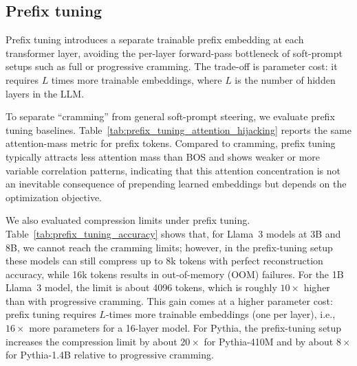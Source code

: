 \subsection{Prefix tuning}

Prefix tuning introduces a separate trainable prefix embedding at each transformer layer, avoiding the per-layer forward-pass bottleneck of soft-prompt setups such as full or progressive cramming. The trade-off is parameter cost: it requires $L$ times more trainable embeddings, where $L$ is the number of hidden layers in the LLM.

To separate ``cramming'' from general soft-prompt steering, we evaluate prefix tuning baselines.
Table~\ref{tab:prefix_tuning_attention_hijacking} reports the same attention-mass metric for prefix tokens.
Compared to cramming, prefix tuning typically attracts less attention mass than BOS and shows weaker or more variable correlation patterns, indicating that this attention concentration is not an inevitable consequence of prepending learned embeddings but depends on the optimization objective.

We also evaluated compression limits under prefix tuning. Table~\ref{tab:prefix_tuning_accuracy} shows that, for Llama~3 models at 3B and 8B, we cannot reach the cramming limits; however, in the prefix-tuning setup these models can still compress up to 8k tokens with perfect reconstruction accuracy, while 16k tokens results in out-of-memory (OOM) failures. For the 1B Llama~3 model, the limit is about 4096 tokens, which is roughly \(10\times\) higher than with progressive cramming. This gain comes at a higher parameter cost: prefix tuning requires \(L\)-times more trainable embeddings (one per layer), i.e., \(16\times\) more parameters for a 16-layer model.
For Pythia, the prefix-tuning setup increases the compression limit by about \(20\times\) for Pythia-410M and by about \(8\times\) for Pythia-1.4B relative to progressive cramming.


\begin{table}[tb]
    \centering
    \caption{Prefix-tuning attention mass, computed with the same metric as Table~\ref{tab:attn_hijacking} but for learned prefix tokens instead of the compression embedding.}
    \label{tab:prefix_tuning_attention_hijacking}
    \begin{small}
    
    \end{small}
\vskip -0.1in
\end{table}


